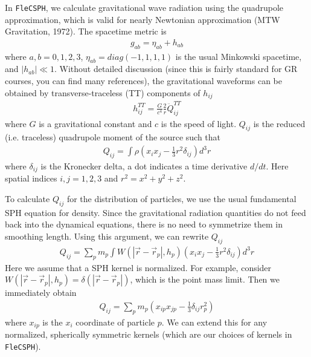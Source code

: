\documentclass{article}
\begin{document}
In \texttt{FleCSPH}, we calculate gravitational wave radiation using the quadrupole approximation, 
which is valid for nearly Newtonian approximation (MTW Gravitation, 1972). The spacetime metric is
\begin{align}
g_{ab} = \eta_{ab} + h_{ab}
\end{align}
where $a,b=0,1,2,3$, $\eta_{ab} = diag(-1,1,1,1)$ is the usual Minkowski spacetime, and $|h_{ab}| \ll 1$.
Without detailed discussion (since this is fairly standard for GR courses, you can find many references),
the gravitational waveforms can be obtained by transverse-traceless (TT) components of $h_{ij}$
\begin{align}
\label{eqn:met:tt}
h^{TT}_{ij} = \frac{G}{c^4} \frac{2}{r} \ddot{Q}^{TT}_{ij}
\end{align}
where $G$ is a gravitational constant and $c$ is the speed of light. 
$Q_{ij}$ is the reduced (i.e. traceless) quadrupole moment of the source such that
\begin{align}
Q_{ij} = \int \rho \left(x_i x_j - \frac{1}{3} r^2 \delta_{ij} \right) d^3 r 
\end{align}
where $\delta_{ij}$ is the Kronecker delta, a dot indicates a time derivative $d/dt$. 
Here spatial indices $i,j = 1,2,3$ and  $r^2 = x^2 + y^2 + z^2$.

To calculate $Q_{ij}$ for the distribution of particles, we use the usual fundamental
SPH equation for density. Since the gravitational radiation quantities do not feed
back into the dynamical equations, there is no need to symmetrize them in smoothing length.
Using this argument, we can rewrite $Q_{ij}$
\begin{align}
\label{eqn:quad:int:SPH}
Q_{ij} = \sum_p m_p \int W(|\vec{r} - \vec{r}_p|, h_p) \left(x_i x_j - \frac{1}{3} r^2 \delta_{ij}\right) d^3 r 
\end{align}
Here we assume that a SPH kernel is normalized. For example, consider 
$W(|\vec{r} - \vec{r}_p|, h_p) = \delta(|\vec{r} - \vec{r}_p|)$, which is the point mass limit. 
Then we immediately obtain 
\begin{align}
Q_{ij} = \sum_p m_p \left(x_{ip} x_{jp} - \frac{1}{3} \delta_{ij} r^2_p \right)
\end{align}
where $x_{ip}$ is the $x_i$ coordinate of particle $p$. We can extend this for any
normalized, spherically symmetric kernels (which are our choices of kernels in \texttt{FleCSPH}).
\end{document}
